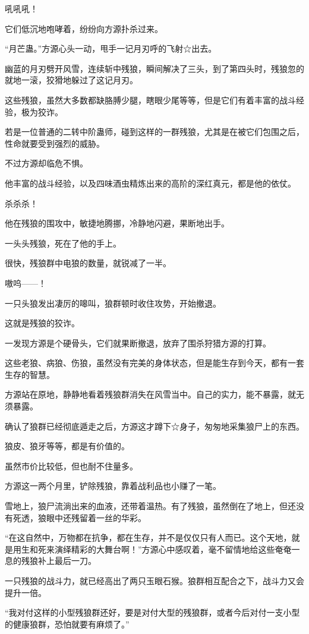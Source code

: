 \begin{this_body}
吼吼吼！

它们低沉地咆哮着，纷纷向方源扑杀过来。

“月芒蛊。”方源心头一动，甩手一记月刃呼的飞射☆出去。

幽蓝的月刃劈开风雪，连续斩中残狼，瞬间解决了三头，到了第四头时，残狼忽的就地一滚，狡猾地躲过了这记月刃。

这些残狼，虽然大多数都缺胳膊少腿，瞎眼少尾等等，但是它们有着丰富的战斗经验，极为狡诈。

若是一位普通的二转中阶蛊师，碰到这样的一群残狼，尤其是在被它们包围之后，性命就要受到强烈的威胁。

不过方源却临危不惧。

他丰富的战斗经验，以及四味酒虫精炼出来的高阶的深红真元，都是他的依仗。

杀杀杀！

他在残狼的围攻中，敏捷地腾挪，冷静地闪避，果断地出手。

一头头残狼，死在了他的手上。

很快，残狼群中电狼的数量，就锐减了一半。

嗷呜——！

一只头狼发出凄厉的嗥叫，狼群顿时收住攻势，开始撤退。

这就是残狼的狡诈。

一发现方源是个硬骨头，它们就果断撤退，放弃了围杀狩猎方源的打算。

这些老狼、病狼、伤狼，虽然没有完美的身体状态，但是能生存到今天，都有一套生存的智慧。

方源站在原地，静静地看着残狼群消失在风雪当中。自己的实力，能不暴露，就无须暴露。

确认了狼群已经彻底遁走之后，方源这才蹲下☆身子，匆匆地采集狼尸上的东西。

狼皮、狼牙等等，都是有价值的。

虽然市价比较低，但也耐不住量多。

方源这一两个月里，铲除残狼，靠着战利品也小赚了一笔。

雪地上，狼尸流淌出来的血液，还带着温热。有了残狼，虽然倒在了地上，但还没有死透，狼眼中还残留着一丝的华彩。

“在这自然中，万物都在抗争，都在生存，并不是仅仅只有人而已。这个天地，就是用生和死来演绎精彩的大舞台啊！”方源心中感叹着，毫不留情地给这些奄奄一息的残狼补上最后一刀。

一只残狼的战斗力，就已经高出了两只玉眼石猴。狼群相互配合之下，战斗力又会提升一倍。

“我对付这样的小型残狼群还好，要是对付大型的残狼群，或者今后对付一支小型的健康狼群，恐怕就要有麻烦了。”


\end{this_body}
